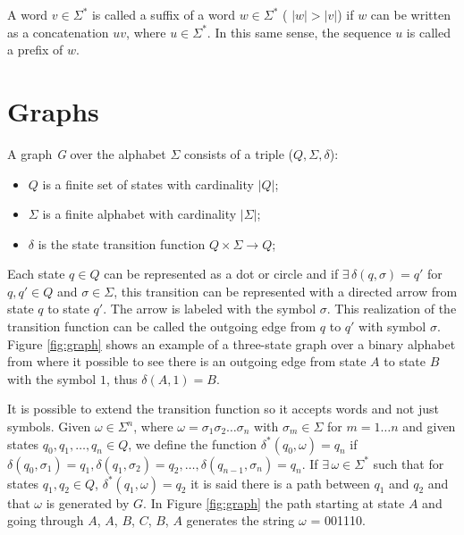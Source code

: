 {A word $v \in \Sigma^*$ is called a suffix of a word $w \in \Sigma^*$ ( $|\textit{w}| > |\textit{v}|$) if $w$ can be written as a concatenation $uv$, where $u \in \Sigma^*$. In this same sense, the sequence $u$ is called a prefix of $w$. 

\section{Graphs}

\begin{definition}\label{def:graph}
A graph \textit{G} over the alphabet $\Sigma$ consists of a triple ($Q, \Sigma,\delta$):
\begin{itemize}
	\item $Q$ is a finite set of states with cardinality $|Q|$;
    \item $\Sigma$ is a finite alphabet with cardinality $|\Sigma|$;
    \item $\delta$ is the state transition function $Q\times\Sigma \rightarrow Q$;
\end{itemize}
\end{definition}

Each state $q \in Q$ can be represented as a dot or circle and if $\exists\, \delta(q, \sigma) = q'$ for $q, q' \in Q$ and $\sigma \in \Sigma$, this transition can be represented with a directed arrow from state $q$ to state $q'$. The arrow is labeled with the symbol $\sigma$. This realization of the transition function can be called the outgoing edge from $q$ to $q'$ with symbol $\sigma$. Figure \ref{fig:graph} shows an example of a three-state graph over a binary alphabet from where it possible to see there is an outgoing edge from state $A$ to state $B$ with the symbol $1$, thus $\delta(A, 1) = B$.

It is possible to extend the transition function so it accepts words and not just symbols. Given $\omega \in \Sigma^n$, where $\omega = \sigma_1\sigma_2\ldots\sigma_n$ with $\sigma_m \in \Sigma$ for $m = 1\ldots n$ and given states $q_0, q_1, \ldots, q_n \in Q$, we define the function $\delta^*(q_0, \omega) = q_n$ if $\delta(q_0, \sigma_1) = q_1, \delta(q_1,\sigma_2) = q_2, \ldots, \delta(q_{n-1},\sigma_n) = q_n$. If $\exists\, \omega \in \Sigma^*$ such that for states $q_1, q_2 \in Q$, $\delta^*(q_1,\omega) = q_2$ it is said there is a path between $q_1$ and $q_2$ and that $\omega$ is generated by $G$. In Figure \ref{fig:graph} the path starting at state $A$ and going through $A$, $A$, $B$, $C$, $B$, $A$ generates the string $\omega	$ = 001110.

}
